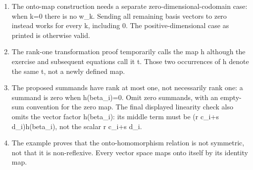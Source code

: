 \begin{enumerate}
\item The onto-map construction needs a separate zero-dimensional-codomain case: when k=0 there is no w\_k. Sending all remaining basis vectors to zero instead works for every k, including 0. The positive-dimensional case as printed is otherwise valid.
\item The rank-one transformation proof temporarily calls the map h although the exercise and subsequent equations call it t. Those two occurrences of h denote the same t, not a newly defined map.
\item The proposed summands have rank at most one, not necessarily rank one: a summand is zero when h(beta\_i)=0. Omit zero summands, with an empty-sum convention for the zero map. The final displayed linearity check also omits the vector factor h(beta\_i): its middle term must be (r c\_i+s d\_i)h(beta\_i), not the scalar r c\_i+s d\_i.
\item The example proves that the onto-homomorphism relation is not symmetric, not that it is non-reflexive. Every vector space maps onto itself by its identity map.
\end{enumerate}
